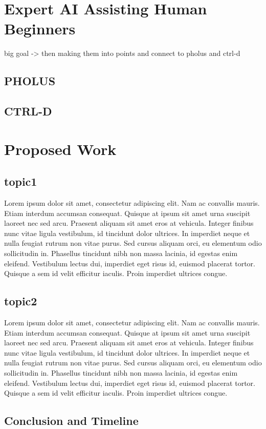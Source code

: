 \documentclass[oneside]{memoir}
\begin{document}
%
%

\chapter{Expert AI Assisting Human Beginners}
\label{ch:expert_AI}
big goal -> then making them into points and connect to pholus and ctrl-d 
\section{PHOLUS}
\label{sec:pholus}
\section{CTRL-D}
\label{sec:ctrld}

%
%

\chapter{Proposed Work}
\label{ch:proposal}

\section{topic1}

Lorem ipsum dolor sit amet, consectetur adipiscing elit. Nam ac convallis mauris. Etiam interdum accumsan consequat. Quisque at ipsum sit amet urna suscipit laoreet nec sed arcu. Praesent aliquam sit amet eros at vehicula. Integer finibus nunc vitae ligula vestibulum, id tincidunt dolor ultrices. In imperdiet neque et nulla feugiat rutrum non vitae purus. Sed cursus aliquam orci, eu elementum odio sollicitudin in. Phasellus tincidunt nibh non massa lacinia, id egestas enim eleifend. Vestibulum lectus dui, imperdiet eget risus id, euismod placerat tortor. Quisque a sem id velit efficitur iaculis. Proin imperdiet ultrices congue.

\section{topic2}
Lorem ipsum dolor sit amet, consectetur adipiscing elit. Nam ac convallis mauris. Etiam interdum accumsan consequat. Quisque at ipsum sit amet urna suscipit laoreet nec sed arcu. Praesent aliquam sit amet eros at vehicula. Integer finibus nunc vitae ligula vestibulum, id tincidunt dolor ultrices. In imperdiet neque et nulla feugiat rutrum non vitae purus. Sed cursus aliquam orci, eu elementum odio sollicitudin in. Phasellus tincidunt nibh non massa lacinia, id egestas enim eleifend. Vestibulum lectus dui, imperdiet eget risus id, euismod placerat tortor. Quisque a sem id velit efficitur iaculis. Proin imperdiet ultrices congue.

\section{Conclusion and Timeline}



\end{document}
